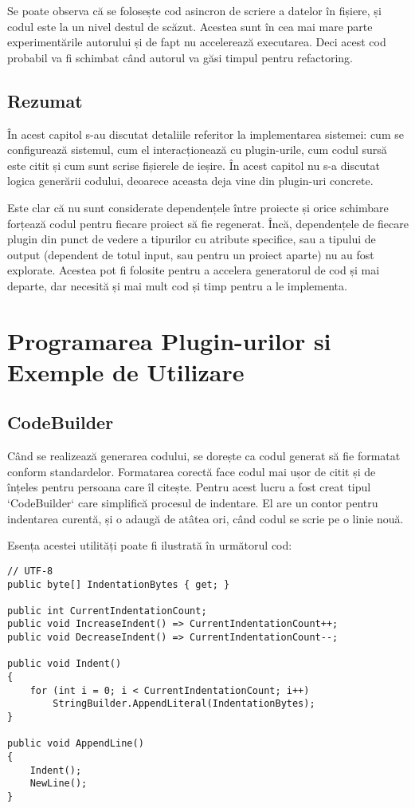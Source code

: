 \documentclass{report}
\begin{document}
Se poate observa că se folosește cod asincron de scriere a datelor în fișiere, și codul este la un nivel destul de scăzut.
Acestea sunt în cea mai mare parte experimentările autorului și de fapt nu accelerează executarea.
Deci acest cod probabil va fi schimbat când autorul va găsi timpul pentru refactoring.

\section{Rezumat}

În acest capitol s-au discutat detaliile referitor la implementarea sistemei: cum se configurează sistemul, cum el interacționează cu plugin-urile, cum codul sursă este citit și cum sunt scrise fișierele de ieșire.
În acest capitol nu s-a discutat logica generării codului, deoarece aceasta deja vine din plugin-uri concrete.

Este clar că nu sunt considerate dependențele între proiecte și orice schimbare forțează codul pentru fiecare proiect să fie regenerat.
Încă, dependențele de fiecare plugin din punct de vedere a tipurilor cu atribute specifice, sau a tipului de output (dependent de totul input, sau pentru un proiect aparte) nu au fost explorate.
Acestea pot fi folosite pentru a accelera generatorul de cod și mai departe, dar necesită și mai mult cod și timp pentru a le implementa.

\chapter{Programarea Plugin-urilor si Exemple de Utilizare}

\section{CodeBuilder}

Când se realizează generarea codului, se dorește ca codul generat să fie formatat conform standardelor.
Formatarea corectă face codul mai ușor de citit și de înțeles pentru persoana care îl citește.
Pentru acest lucru a fost creat tipul `CodeBuilder` care simplifică procesul de indentare.
El are un contor pentru indentarea curentă, și o adaugă de atâtea ori, când codul se scrie pe o linie nouă.

Esența acestei utilități poate fi ilustrată în următorul cod:

\begin{lstlisting}
// UTF-8
public byte[] IndentationBytes { get; }

public int CurrentIndentationCount;
public void IncreaseIndent() => CurrentIndentationCount++;
public void DecreaseIndent() => CurrentIndentationCount--;

public void Indent()
{
    for (int i = 0; i < CurrentIndentationCount; i++)
        StringBuilder.AppendLiteral(IndentationBytes);
}

public void AppendLine() 
{ 
    Indent();
    NewLine();
}
\end{lstlisting}
\end{document}
